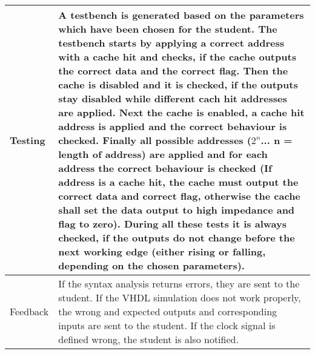     \begin{tabular}{|p{2cm}|p{11cm}|}
	\hline
        Testing & A testbench is generated based on the parameters which have been chosen for the student. The testbench starts by applying a correct address with a cache hit and checks, if the cache outputs the correct data and the correct flag. Then the cache is disabled and it is checked, if the outputs stay disabled while different cach hit addresses are applied. Next the cache is enabled, a cache hit address is applied and the correct behaviour is checked. Finally all possible addresses ($2^{n}$... n = length of address) are applied and for each address the correct behaviour is checked (If address is a cache hit, the cache must output the correct data and correct flag, otherwise the cache shall set the data output to high impedance and flag to zero). During all these tests it is always checked, if the outputs do not change before the next working edge (either rising or falling, depending on the chosen parameters).
        \\
        \hline
        Feedback & If the syntax analysis returns errors, they are sent to the student. If the VHDL simulation does not work properly, the wrong
        and expected outputs and corresponding inputs are sent to the student. If the clock signal is defined wrong, the student is also notified.
        \\
        \hline
    \end{tabular}


